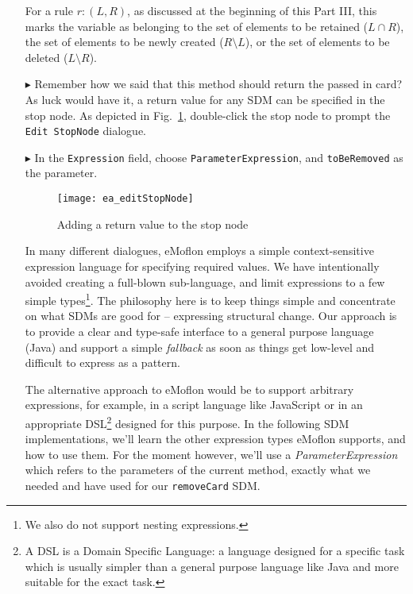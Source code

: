 \begin{itemize}
For a rule $r: (L, R)$, as discussed at the beginning of this Part III, this marks the variable as belonging to the set of elements to be retained ($L\cap R$), the
set of elements to be newly created ($R\setminus L$), or the set of elements to be deleted ($L\setminus R$).

\item[$\blacktriangleright$] Remember how we said that this method should return the passed in card? As luck would have it, a return value for any SDM can be
specified in the stop node. As depicted in Fig.~\ref{fig:stop_node_return_value}, double-click the stop node to prompt the \texttt{Edit StopNode} dialogue. 

\item[$\blacktriangleright$] In the \texttt{Expression} field, choose \texttt{ParameterExpression}, and \texttt{toBeRemoved} as the parameter.

\begin{figure}[htp]
\begin{center}
  \texttt{[image: ea\_editStopNode]}
  \caption{Adding a return value to the stop node}  
  \label{fig:stop_node_return_value}
\end{center}
\end{figure}

In many different dialogues, eMoflon employs a simple context-sensitive expression language for specifying required values. We have intentionally
avoided creating a full-blown sub-language, and limit expressions to a few simple types\footnote{We also do not support nesting expressions.}. The philosophy here
is to keep things simple and concentrate on what SDMs are good for -- expressing structural change. Our approach is to provide a clear and type-safe interface
to a general purpose language (Java) and support a simple \emph{fallback} as soon as things get low-level and difficult to express as a pattern.

The alternative approach to eMoflon would be to support arbitrary expressions, for example, in a script language like JavaScript or in an appropriate
DSL\footnote{A DSL is a Domain Specific Language: a language designed for a specific task which is usually simpler than a general purpose language like Java and
more suitable for the exact task.} designed for this purpose. In the following SDM implementations, we'll learn the other expression types eMoflon supports,
and how to use them. For the moment however, we'll use a \emph{ParameterExpression} which refers to the parameters of the current
method, exactly what we needed and have used for our \texttt{removeCard} SDM.


\end{itemize}
